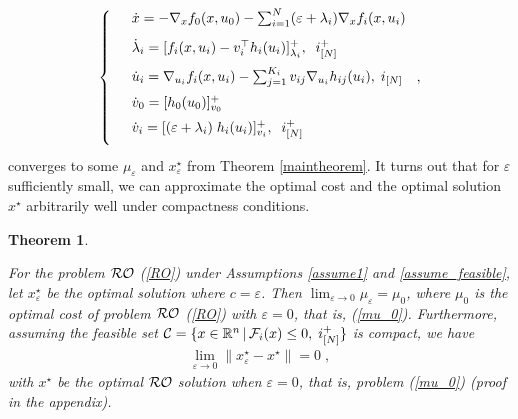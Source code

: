 \documentclass[journal,twoside,web]{ieeecolor}
\newtheorem{theorem}{Theorem}
\begin{document}
\begin{align} \label{pd_dynamics_ep}
\left\{
\begin{array}{cl}
\vspace{3mm}
&\dot x=-\nabla_x f_0(x,u_0)- \sum_{i=1}^N(\varepsilon+\lambda_i) \nabla_x f_i(x,u_i)\\
\vspace{2mm}
&\dot \lambda_i=[f_i(x,u_i)-v_i^\top h_i(u_i)]_{\lambda_i}^+,\;\; i^+_{[N]}\\
\vspace{2mm}
&\dot u_i=\nabla_{u_i}f_i(x,u_i)-  \sum_{j=1}^{K_i} v_{ij} \nabla_{u_i} h_{ij}(u_i),\; i_{[N]}\\
\vspace{2mm}
&\dot{v}_0=[h_0(u_0)]_{v_0}^+\\
\vspace{2mm}
&\dot v_i=[(\varepsilon+\lambda_i) \; h_i(u_i)]_{v_i}^+,\;\;i^+_{[N]}
\end{array}\right.,
\end{align}
converges to some $\mu_{\varepsilon}$ and $x^\star_{\varepsilon}$ from Theorem \ref{maintheorem}. It turns out that for $\varepsilon$ sufficiently small, we can approximate the optimal cost and the optimal solution $x^\star$ arbitrarily well under compactness conditions.

\begin{theorem} \label{RO_ROperturbed}

For the problem ${\cal RO}$ (\ref{RO}) under Assumptions \ref{assume1} and \ref{assume_feasible}, let $x^\star_\varepsilon$ be the optimal solution where $c=\varepsilon$. Then
$\displaystyle\lim_{\varepsilon \to 0}\mu_\varepsilon=\mu_0$, where $\mu_0$ is the optimal cost of problem ${\cal RO}$ (\ref{RO}) with $\varepsilon=0$, that is, (\ref{mu_0}). Furthermore, assuming the feasible set ${\cal C}=\{x\in \mathbb{R}^n\,|\,{\cal F}_i(x)\leq 0,\; i^+_{[N]}\}$ is compact, we have
\begin{align*}
\displaystyle\lim_{\varepsilon \to 0} \parallel x_\varepsilon^\star-x^\star \parallel=0\;,
\end{align*}
with $x^\star$ be the optimal ${\cal RO}$ solution when $\varepsilon=0$, that is, problem (\ref{mu_0}) (proof in the appendix).
\end{theorem}
\end{document}
